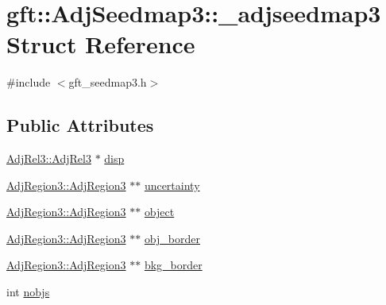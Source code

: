 \hypertarget{structgft_1_1AdjSeedmap3_1_1__adjseedmap3}{\section{gft\-:\-:Adj\-Seedmap3\-:\-:\-\_\-adjseedmap3 Struct Reference}
\label{structgft_1_1AdjSeedmap3_1_1__adjseedmap3}
}


{\ttfamily \#include $<$gft\-\_\-seedmap3.\-h$>$}

\subsection*{Public Attributes}
\begin{DoxyCompactItemize}
\item 
\hyperlink{namespacegft_1_1AdjRel3_a0d54e2f148bf5636f3a3faf70d4eb5ae}{Adj\-Rel3\-::\-Adj\-Rel3} $\ast$ \hyperlink{structgft_1_1AdjSeedmap3_1_1__adjseedmap3_a6f45e70cf139e2d719329d24d640ddc4}{disp}
\item 
\hyperlink{namespacegft_1_1AdjRegion3_a50e41e32ed23c8a2c4027f2ea29d501b}{Adj\-Region3\-::\-Adj\-Region3} $\ast$$\ast$ \hyperlink{structgft_1_1AdjSeedmap3_1_1__adjseedmap3_a52a87c951c6dc129f925c652464ec475}{uncertainty}
\item 
\hyperlink{namespacegft_1_1AdjRegion3_a50e41e32ed23c8a2c4027f2ea29d501b}{Adj\-Region3\-::\-Adj\-Region3} $\ast$$\ast$ \hyperlink{structgft_1_1AdjSeedmap3_1_1__adjseedmap3_a13f54f99f6a0b373577e69675ba3f989}{object}
\item 
\hyperlink{namespacegft_1_1AdjRegion3_a50e41e32ed23c8a2c4027f2ea29d501b}{Adj\-Region3\-::\-Adj\-Region3} $\ast$$\ast$ \hyperlink{structgft_1_1AdjSeedmap3_1_1__adjseedmap3_a38b58c0d268fd157dbdd17b1d4407d7a}{obj\-\_\-border}
\item 
\hyperlink{namespacegft_1_1AdjRegion3_a50e41e32ed23c8a2c4027f2ea29d501b}{Adj\-Region3\-::\-Adj\-Region3} $\ast$$\ast$ \hyperlink{structgft_1_1AdjSeedmap3_1_1__adjseedmap3_afef39996c0e26745d64e12ad10a5d4e8}{bkg\-\_\-border}
\item 
int \hyperlink{structgft_1_1AdjSeedmap3_1_1__adjseedmap3_ae42ccc829e5c8fff7a2033bab83733bc}{nobjs}
\end{DoxyCompactItemize}


